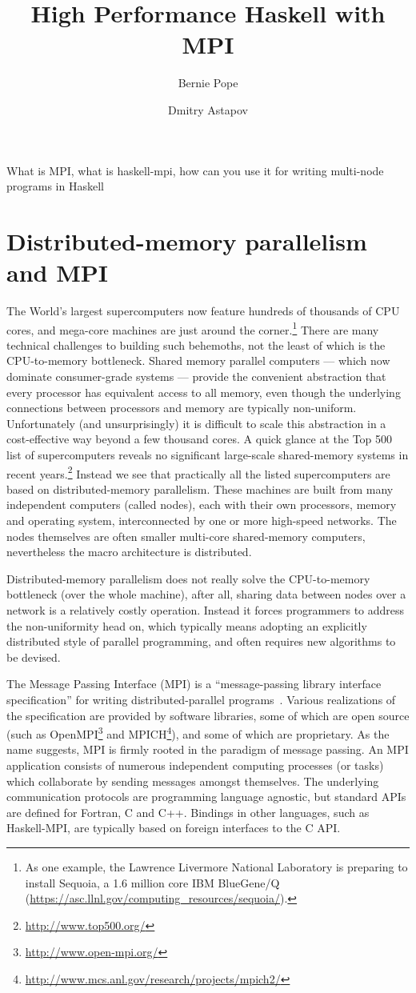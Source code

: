 \documentclass{tmr}
\title{High Performance Haskell with MPI}
\author{Bernie Pope\email{bjpope@unimelb.edu.au}}
\author{Dmitry Astapov\email{dastapov@gmail.com}}
\begin{document}
\begin{introduction} 
What is MPI, what is haskell-mpi, how can you use it for writing multi-node programs in Haskell%
\end{introduction}

\section{Distributed-memory parallelism and MPI}

The World's largest supercomputers now feature hundreds of thousands of CPU cores, and mega-core machines
are just around the corner.\footnote{As one example, the Lawrence Livermore National Laboratory
is preparing to install Sequoia, a 1.6 million core IBM BlueGene/Q (\url{https://asc.llnl.gov/computing_resources/sequoia/}).} There are many technical
challenges to building such behemoths, not the least of which is
the CPU-to-memory bottleneck. Shared memory parallel computers --- which now dominate consumer-grade
systems --- provide the convenient abstraction that every processor has equivalent access to all memory,
even though the underlying connections between processors and memory are typically non-uniform.
Unfortunately (and unsurprisingly) it is difficult to scale this abstraction in a
cost-effective way beyond a few thousand cores. A quick glance at the Top 500 list of supercomputers reveals
no significant large-scale shared-memory systems in recent years.\footnote{\url{http://www.top500.org/}}
Instead we see that practically all the listed supercomputers are based on
distributed-memory parallelism. These machines are built from many independent computers (called nodes),
each with their own processors, memory and operating system, interconnected by one or more high-speed networks.
The nodes themselves are often smaller multi-core shared-memory computers, nevertheless
the macro architecture is distributed.

Distributed-memory parallelism does not really solve the CPU-to-memory bottleneck (over the whole machine),
after all, sharing data between nodes over a network is a relatively costly operation.
Instead it forces programmers to
address the non-uniformity head on, which typically means adopting an explicitly distributed style of
parallel programming, and often requires new algorithms to be devised.

The Message Passing Interface (MPI) is a ``message-passing library interface specification''
for writing distributed-parallel programs~\cite{mpi-report}. Various realizations of the
specification are provided by software libraries, some of which are open source
(such as OpenMPI\footnote{\url{http://www.open-mpi.org/}} and MPICH\footnote{\url{http://www.mcs.anl.gov/research/projects/mpich2/}}), and some of which are proprietary.
As the name suggests, MPI is firmly rooted in the paradigm of message passing.
An MPI application consists of numerous independent computing processes (or tasks)
which collaborate by sending messages amongst themselves.
The underlying communication protocols are programming language agnostic, but standard APIs are
defined for Fortran, C and C++. Bindings in other languages, such as Haskell-MPI,
are typically based on foreign interfaces to the C API.
\end{document}
